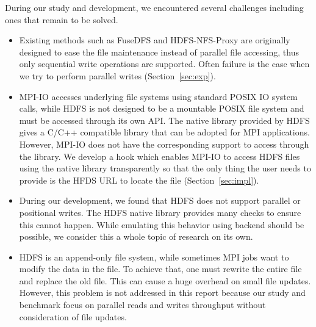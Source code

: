 During our study and development, we encountered several
challenges including ones that remain to be solved.
\begin{itemize}
\item Existing methods such as FuseDFS and HDFS-NFS-Proxy are originally designed to ease the file
	maintenance instead of parallel file accessing, thus only sequential
	write operations are supported. Often failure is the case when we try to
	perform parallel writes (Section~\ref{sec:exp}). 
\item MPI-IO accesses underlying file systems using standard POSIX IO system
	calls, while HDFS is not designed to be a mountable POSIX file system
	and must be accessed through its own API. The native library provided by
	HDFS gives a C/C++ compatible library that can be adopted for MPI
	applications.
	However, MPI-IO does not have the corresponding support to access
	through the library. We develop a hook which enables MPI-IO to access
	HDFS files using the native library transparently so that the only thing
	the user needs to provide is the HFDS URL to locate the file
	(Section~\ref{sec:impl}).
\item During our development, we found that HDFS does not support 
	parallel or positional writes. The HDFS native library provides many
	checks to ensure this cannot happen. While emulating this behavior
	using backend should be possible, we consider this a whole topic of
	research on its own.
\item HDFS is an append-only file system, while sometimes MPI jobs want to
	modify the data in the file. To achieve that, one must rewrite the
	entire file and replace the old file. This can cause a huge overhead on
	small file updates. However, this problem is not addressed in this
	report because our study and benchmark focus on parallel reads and
	writes throughput without consideration of file updates.
\end{itemize}

